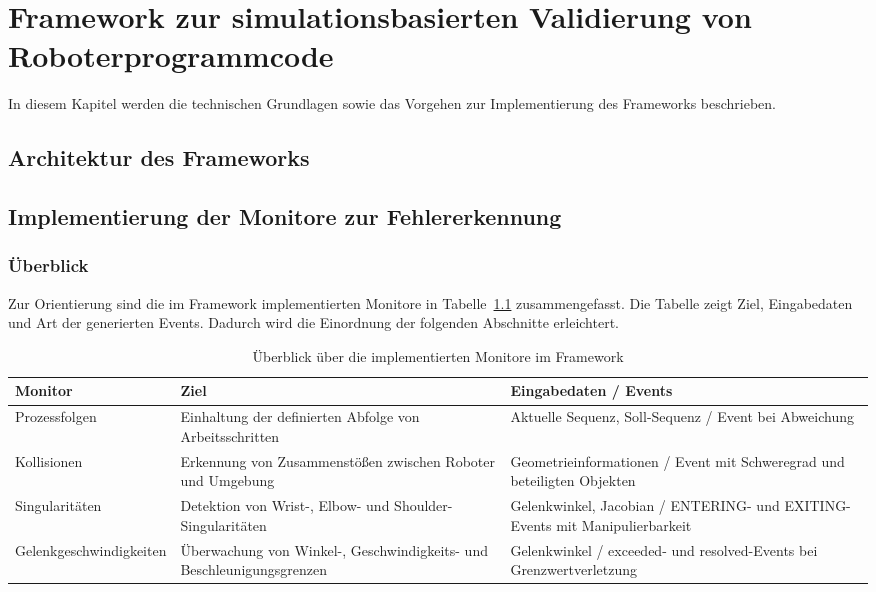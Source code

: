 \chapter{Framework zur simulationsbasierten Validierung von Roboterprogrammcode}
\label{sec:framework}

In diesem Kapitel werden die technischen Grundlagen sowie das Vorgehen zur
Implementierung des Frameworks beschrieben.

\section{Architektur des Frameworks}
\label{sec:architektur_frameowork}


\section{Implementierung der Monitore zur Fehlererkennung}

\subsection*{Überblick}
Zur Orientierung sind die im Framework implementierten Monitore in
Tabelle~\ref{tab:monitor_overview_arch} zusammengefasst. Die Tabelle zeigt Ziel,
Eingabedaten und Art der generierten Events. Dadurch wird die Einordnung der
folgenden Abschnitte erleichtert.

\begin{table}[H]
  \centering
  \small
  \begin{tabularx}{\textwidth}{lXX}
    \toprule
    \textbf{Monitor}        & \textbf{Ziel}
    & \textbf{Eingabedaten / Events} \\
    \midrule
    Prozessfolgen           & Einhaltung der definierten Abfolge von
    Arbeitsschritten               &
    Aktuelle Sequenz, Soll-Sequenz / Event bei Abweichung
    \\
    \addlinespace
    Kollisionen             & Erkennung von Zusammenstößen zwischen
    Roboter und Umgebung            &
    Geometrieinformationen / Event mit Schweregrad und beteiligten
    Objekten                                                          \\
    \addlinespace
    Singularitäten          & Detektion von Wrist-, Elbow- und
    Shoulder-Singularitäten              &
    Gelenkwinkel, Jacobian / ENTERING- und EXITING-Events mit
    Manipulierbarkeit                                                      \\
    \addlinespace
    Gelenkgeschwindigkeiten & Überwachung von Winkel-,
    Geschwindigkeits- und Beschleunigungsgrenzen &
    Gelenkwinkel / exceeded- und resolved-Events bei
    Grenzwertverletzung
    \\
    \bottomrule
  \end{tabularx}
  \caption{Überblick über die implementierten Monitore im Framework}
  \label{tab:monitor_overview_arch}
\end{table}

